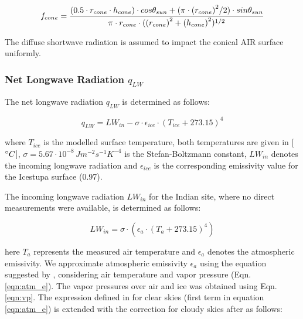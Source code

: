 \documentclass[utf8]{frontiersSCNS}
\begin{document}
\begin{equation}
	\begin{split}
		f_{cone}& =\frac{(0.5 \cdot r_{cone} \cdot h_{cone}) \cdot cos \theta_{sun} +(\pi \cdot
			{(r_{cone})}^2/2) \cdot sin \theta_{sun} }{\pi \cdot r_{cone} \cdot ({(r_{cone})}^2+{(h_{cone})}^2)^{1/2}}\\
	\end{split}
	\label{eqn:f_{cone}}
\end{equation}

The diffuse shortwave radiation is assumed to impact the conical AIR surface uniformly.

\subsubsection{Net Longwave Radiation \texorpdfstring{$q_{LW}$}{Lg}} \label{sec:LW}

The net longwave radiation $q_{LW}$ is determined as follows:

\begin{equation}
	q_{LW}= LW_{in}-\sigma \cdot \epsilon_{ice} \cdot {(T_{ice}+ 273.15)}^4
	\label{eqn:LW}
\end{equation}

where $T_{ice}$ is the modelled surface temperature, both temperatures are given in [$\degree C$],
$\sigma=5.67\cdot10^{-8}\,Jm^{-2}s^{-1}K^{-4}$ is the Stefan-Boltzmann constant, $LW_{in}$ denotes the incoming
longwave radiation and $\epsilon_{ice}$ is the corresponding emissivity value for the Icestupa surface (0.97).

The incoming longwave radiation $LW_{in}$ for the Indian site, where no direct measurements were available, is
determined as follows:

\begin{equation}
	LW_{in}=\sigma \cdot (\epsilon_a \cdot {(T_a+ 273.15)}^4)
	\label{eqn:LWin}
\end{equation}

here $T_a$ represents the measured air temperature and $\epsilon_a$ denotes the atmospheric emissivity. We
approximate atmospheric emissivity $\epsilon_a$ using the equation suggested by \cite{Brutsaert_1982},
considering air temperature and vapor pressure (Eqn.  \ref{eqn:atm_e}). The vapor pressures over air and ice was
obtained using Eqn. \ref{eqn:vp}.  The expression defined in \cite{Brutsaert_1975} for clear skies (first term
in equation \ref{eqn:atm_e}) is extended with the correction for cloudy skies after \cite{Brutsaert_1982} as
follows:
\end{document}

